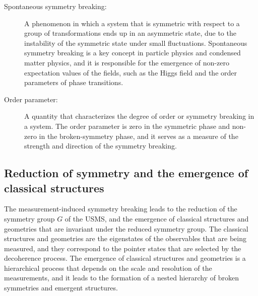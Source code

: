 \begin{tcolorbox}[colback=blue!5!white,colframe=blue!75!black,title=New terms]
\begin{description}
\item[Spontaneous symmetry breaking:] A phenomenon in which a system that is symmetric with respect to a group of transformations ends up in an asymmetric state, due to the instability of the symmetric state under small fluctuations. Spontaneous symmetry breaking is a key concept in particle physics and condensed matter physics, and it is responsible for the emergence of non-zero expectation values of the fields, such as the Higgs field and the order parameters of phase transitions.
\item[Order parameter:] A quantity that characterizes the degree of order or symmetry breaking in a system. The order parameter is zero in the symmetric phase and non-zero in the broken-symmetry phase, and it serves as a measure of the strength and direction of the symmetry breaking.
\end{description}
\end{tcolorbox}

\subsection{Reduction of symmetry and the emergence of classical structures}
The measurement-induced symmetry breaking leads to the reduction of the symmetry group $G$ of the USMS, and the emergence of classical structures and geometries that are invariant under the reduced symmetry group. The classical structures and geometries are the eigenstates of the observables that are being measured, and they correspond to the pointer states that are selected by the decoherence process. The emergence of classical structures and geometries is a hierarchical process that depends on the scale and resolution of the measurements, and it leads to the formation of a nested hierarchy of broken symmetries and emergent structures.


